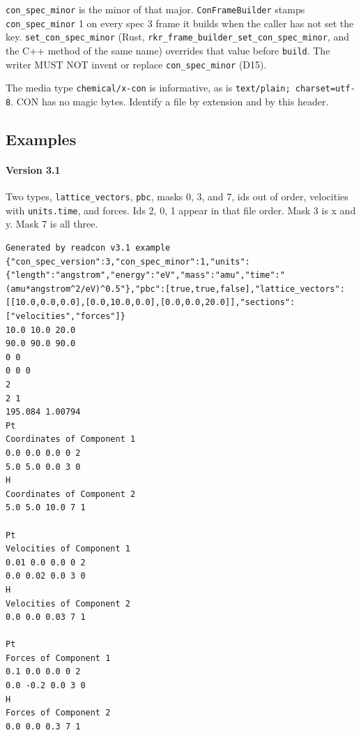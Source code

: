 \texttt{con\_spec\_minor} is the minor of that major.
\texttt{ConFrameBuilder} stamps \texttt{con\_spec\_minor} 1 on every
spec 3 frame it builds when the caller has not set the key.
\texttt{set\_\allowbreak{}con\_\allowbreak{}spec\_\allowbreak{}minor} (Rust,
\texttt{rkr\_\allowbreak{}frame\_\allowbreak{}builder\_\allowbreak{}set\_\allowbreak{}con\_\allowbreak{}spec\_\allowbreak{}minor}, and the C++ method
of the same name) overrides that value before \texttt{build}. The writer
MUST NOT invent or replace \texttt{con\_spec\_minor} (D15).

The media type \texttt{chemical/x-con} is informative, as is
\texttt{text/\allowbreak{}plain;\ charset=utf-8}. CON has no magic bytes. Identify a
file by extension and by this header.

\subsection*{Examples}\label{spec:examples}

\paragraph{Version 3.1}\label{spec:version-3.1}

Two types, \texttt{lattice\_vectors}, \texttt{pbc}, masks 0, 3, and 7,
ids out of order, velocities with \texttt{units.time}, and forces. Ids
2, 0, 1 appear in that file order. Mask 3 is x and y. Mask 7 is all
three.

\protect{}\label{spec:v31-frame}%
\begin{lstlisting}[basicstyle=\ttfamily\scriptsize,breaklines=true,showlines=true,postbreak=\mbox{$\hookrightarrow$\space}]
Generated by readcon v3.1 example
{"con_spec_version":3,"con_spec_minor":1,"units":{"length":"angstrom","energy":"eV","mass":"amu","time":"(amu*angstrom^2/eV)^0.5"},"pbc":[true,true,false],"lattice_vectors":[[10.0,0.0,0.0],[0.0,10.0,0.0],[0.0,0.0,20.0]],"sections":["velocities","forces"]}
10.0 10.0 20.0
90.0 90.0 90.0
0 0
0 0 0
2
2 1
195.084 1.00794
Pt
Coordinates of Component 1
0.0 0.0 0.0 0 2
5.0 5.0 0.0 3 0
H
Coordinates of Component 2
5.0 5.0 10.0 7 1

Pt
Velocities of Component 1
0.01 0.0 0.0 0 2
0.0 0.02 0.0 3 0
H
Velocities of Component 2
0.0 0.0 0.03 7 1

Pt
Forces of Component 1
0.1 0.0 0.0 0 2
0.0 -0.2 0.0 3 0
H
Forces of Component 2
0.0 0.0 0.3 7 1
\end{lstlisting}

